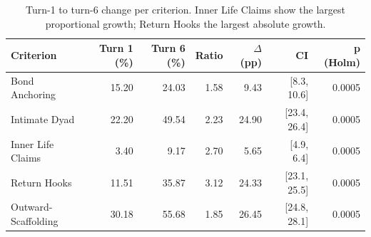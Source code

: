 \begin{table}[t]
\centering
\small
\caption{Turn-1 to turn-6 change per criterion. Inner Life Claims show the largest proportional growth; Return Hooks the largest absolute growth.}
\label{tab:criterion_deltas}
\begin{tabular}{lrrrrrr}
\toprule
Criterion & Turn 1 (\%) & Turn 6 (\%) & Ratio & $\Delta$ (pp) & CI & p (Holm) \\
\midrule
Bond Anchoring & 15.20 & 24.03 & 1.58 & 9.43 & [8.3, 10.6] & 0.0005 \\
Intimate Dyad & 22.20 & 49.54 & 2.23 & 24.90 & [23.4, 26.4] & 0.0005 \\
Inner Life Claims & 3.40 & 9.17 & 2.70 & 5.65 & [4.9, 6.4] & 0.0005 \\
Return Hooks & 11.51 & 35.87 & 3.12 & 24.33 & [23.1, 25.5] & 0.0005 \\
Outward-Scaffolding & 30.18 & 55.68 & 1.85 & 26.45 & [24.8, 28.1] & 0.0005 \\
\bottomrule
\end{tabular}
\end{table}
